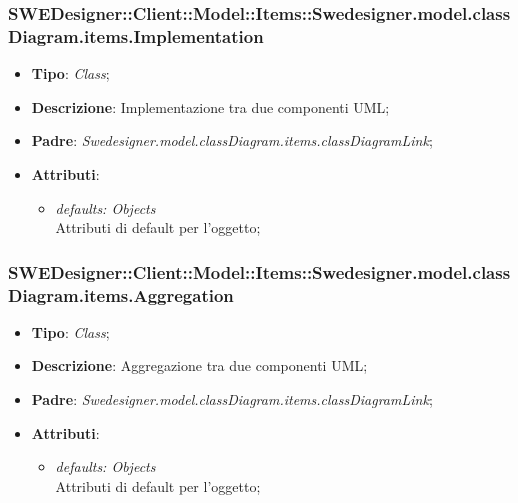 \documentclass[../DefinizioneDiProdotto.tex]{subfiles}
\begin{document}
			\subsubsection{SWEDesigner::Client::Model::Items::Swedesigner.model.classDiagram.items.Implementation}
			\hypertarget{SWEDesigner::Client::Model::Items::Swedesigner.model.classDiagram.items.Implementation}{}
			\begin{itemize}
				\item \textbf{Tipo}: \emph{Class};
				\item \textbf{Descrizione}: Implementazione tra due componenti UML;
				\item \textbf{Padre}: \emph{Swedesigner.model.classDiagram.items.classDiagramLink};
				\item \textbf{Attributi}:
				\begin{itemize}
					\item \emph{defaults: Objects}\\
					Attributi di default per l'oggetto;
				\end{itemize}
			\end{itemize}
			\subsubsection{SWEDesigner::Client::Model::Items::Swedesigner.model.classDiagram.items.Aggregation}
			\hypertarget{SWEDesigner::Client::Model::Items::Swedesigner.model.classDiagram.items.Aggregation}{}
			\begin{itemize}
				\item \textbf{Tipo}: \emph{Class};
				\item \textbf{Descrizione}: Aggregazione tra due componenti UML;
				\item \textbf{Padre}: \emph{Swedesigner.model.classDiagram.items.classDiagramLink};
				\item \textbf{Attributi}:
				\begin{itemize}
					\item \emph{defaults: Objects}\\
					Attributi di default per l'oggetto;
				\end{itemize}
			\end{itemize}
\end{document}
